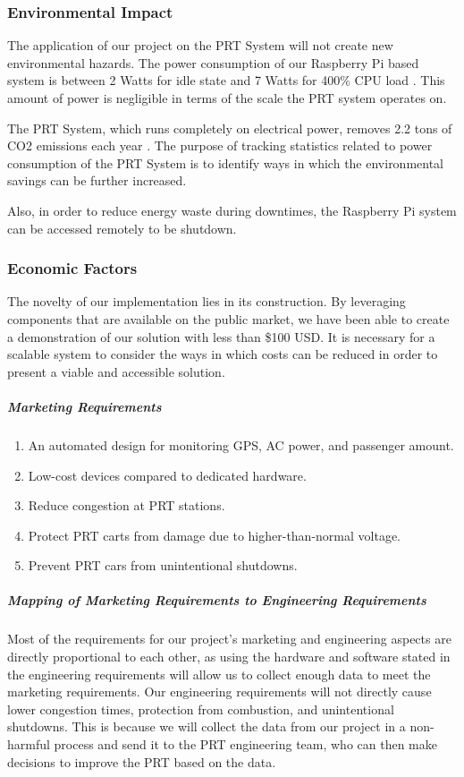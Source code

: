 \subsubsection{Environmental Impact}
The application of our project on the PRT System will not create new environmental hazards. 
The power consumption of our Raspberry Pi based system is between 2 Watts for idle state and 7 Watts for 400\% CPU load \cite{pidramblePowerConsumption}. 
This amount of power is negligible in terms of the scale the PRT system operates on. 

The PRT System, which runs completely on electrical power, removes 2.2 tons of CO2 emissions each year \cite{wvuPersonalRapid}. 
The purpose of tracking statistics related to power consumption of the PRT System is to identify ways in which the environmental savings can be further increased. 

Also, in order to reduce energy waste during downtimes, the Raspberry Pi system can be accessed remotely to be shutdown.

\subsubsection{Economic Factors}
The novelty of our implementation lies in its construction. 
By leveraging components that are available on the public market, we have been able to create a demonstration of our solution with less than \$100 USD. 
It is necessary for a scalable system to consider the ways in which costs can be reduced in order to present a viable and accessible solution.

\subparagraph{Marketing Requirements}
\begin{enumerate}
    \item An automated design for monitoring GPS, AC power, and passenger amount.
    \item Low-cost devices compared to dedicated hardware.
    \item Reduce congestion at PRT stations.
    \item Protect PRT carts from damage due to higher-than-normal voltage.
    \item Prevent PRT cars from unintentional shutdowns.
\end{enumerate}

\subparagraph{Mapping of Marketing Requirements to Engineering Requirements}
Most of the requirements for our project's marketing and engineering aspects are directly proportional to each other, as using the hardware and software stated in the engineering requirements will allow us to collect enough data to meet the marketing requirements. Our engineering requirements will not directly cause lower congestion times, protection from combustion, and unintentional shutdowns. 
This is because we will collect the data from our project in a non-harmful process and send it to the PRT engineering team, who can then make decisions to improve the PRT based on the data.

